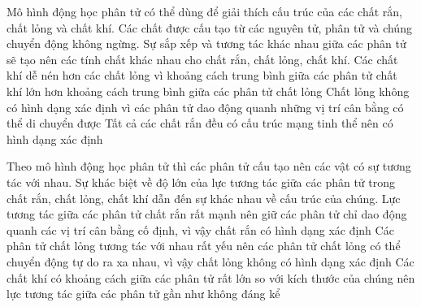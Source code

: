 \begin{ex} 
	Mô hình động học phân tử có thể dùng để giải thích cấu trúc của các chất rắn, chất lỏng và chất khí. Các chất được cấu tạo từ các nguyên tử, phân tử và chúng chuyển động không ngừng. Sự sắp xếp và tương tác khác nhau giữa các phân tử sẽ tạo nên các tính chất khác nhau cho chất rắn, chất lỏng, chất khí.
{Các chất khí dễ nén hơn các chất lỏng vì khoảng cách trung bình giữa các phân tử chất khí lớn hơn khoảng cách trung bình giữa các phân tử chất lỏng}
{Chất lỏng không có hình dạng xác định vì các phân tử dao động quanh những vị trí cân bằng có thể di chuyển được}
{Tất cả các chất rắn đều có cấu trúc mạng tinh thể nên có hình dạng xác định}
\end{ex}

\begin{ex} 
	Theo mô hình động học phân tử thì các phân tử cấu tạo nên các vật có sự tương tác với nhau. Sự khác biệt về độ lớn của lực tương tác giữa các phân tử trong chất rắn, chất lỏng, chất khí dẫn đến sự khác nhau về cấu trúc của chúng.
{Lực tương tác giữa các phân tử chất rắn rất mạnh nên giữ các phân tử chỉ dao động quanh các vị trí cân bằng cố định, vì vậy chất rắn có hình dạng xác định}
{Các phân tử chất lỏng tương tác với nhau rất yếu nên các phân tử chất lỏng có thể chuyển động tự do ra xa nhau, vì vậy chất lỏng không có hình dạng xác định}
{Các chất khí có khoảng cách giữa các phân tử rất lớn so với kích thước của chúng nên lực tương tác giữa các phân tử gần như không đáng kể}
\end{ex}




